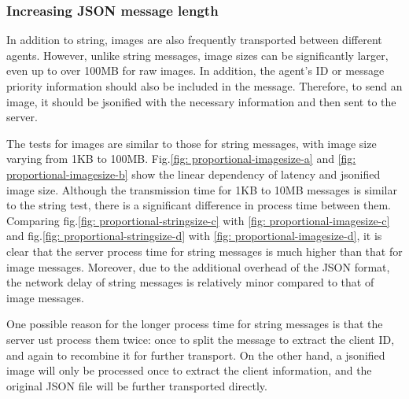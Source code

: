 \subsubsection{Increasing JSON message length}
In addition to string, images are also frequently transported between different agents. 
However, unlike string messages, image sizes can be significantly larger, even up to over 
100MB for raw images. In addition, the agent's ID or message priority information should 
also be included in the message. Therefore, to send an image, it should be jsonified with 
the necessary information and then sent to the server. 



The tests for images are similar to those for string messages, with image size varying 
from 1KB to 100MB. Fig.\ref{fig: proportional-imagesize-a} and \ref{fig: proportional-imagesize-b} 
show the linear dependency of latency and jsonified image size. Although the transmission 
time for 1KB to 10MB messages is similar to the string test, there is a significant 
difference in process time between them. Comparing fig.\ref{fig: proportional-stringsize-c} 
with \ref{fig: proportional-imagesize-c} and fig.\ref{fig: proportional-stringsize-d} 
with \ref{fig: proportional-imagesize-d}, it is clear that the server process time for 
string messages is much higher than that for image messages. Moreover, due to the 
additional overhead of the JSON format, the network delay of string messages is 
relatively minor compared to that of image messages. 




One possible reason for the longer process time for string messages is that the server 
ust process them twice: once to split the message to extract the client ID, and again 
to recombine it for further transport. On the other hand, a jsonified image will only 
be processed once to extract the client information, and the original JSON file will 
be further transported directly.



